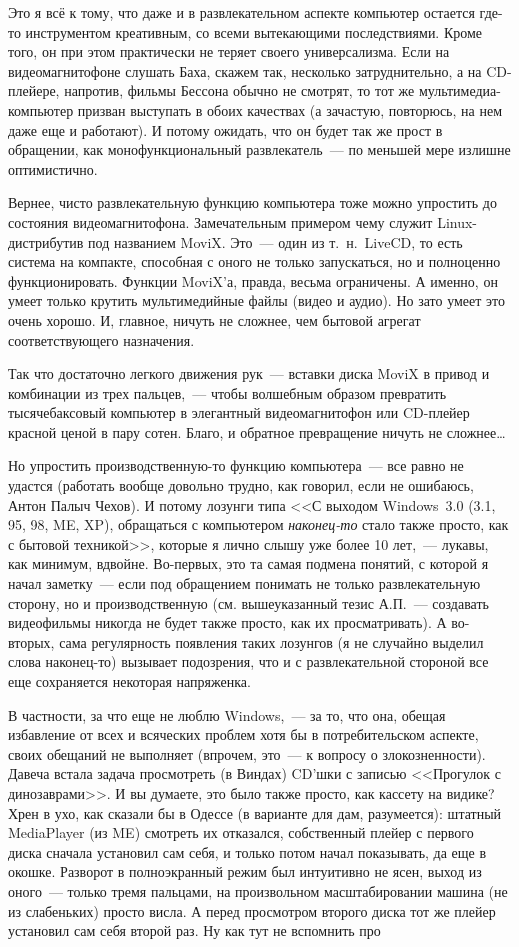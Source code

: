 Это я всё к тому, что даже и в развлекательном аспекте компьютер остается где-то инструментом креативным, со всеми вытекающими последствиями. Кроме того, он при этом практически не теряет своего универсализма. Если на видеомагнитофоне слушать Баха, скажем так, несколько затруднительно, а на CD-плейере, напротив, фильмы Бессона обычно не смотрят, то тот же мультимедиа-компьютер призван выступать в обоих качествах (а зачастую, повторюсь, на нем даже еще и работают). И потому ожидать, что он будет так же прост в обращении, как монофункциональный развлекатель~--- по меньшей мере излишне оптимистично.

Вернее, чисто развлекательную функцию компьютера тоже можно упростить до состояния видеомагнитофона. Замечательным примером чему служит Linux-дистрибутив под названием MoviX. Это~--- один из т.~н.~LiveCD, то есть система на компакте, способная с оного не только запускаться, но и полноценно функционировать. Функции MoviX'а, правда, весьма ограничены. А именно, он умеет только крутить мультимедийные файлы (видео и аудио). Но зато умеет это очень хорошо. И, главное, ничуть не сложнее, чем бытовой агрегат соответствующего назначения.

Так что достаточно легкого движения рук~--- вставки диска MoviX в привод и комбинации из трех пальцев,~--- чтобы волшебным образом превратить тысячебаксовый компьютер в элегантный видеомагнитофон или CD-плейер красной ценой в пару сотен. Благо, и обратное превращение ничуть не сложнее\dots

Но упростить производственную-то функцию компьютера~--- все равно не удастся (работать вообще довольно трудно, как говорил, если не ошибаюсь, Антон Палыч Чехов). И потому лозунги типа <<С выходом Windows~3.0 (3.1, 95, 98, ME, XP), обращаться с компьютером \textit{наконец-то} стало также просто, как с бытовой техникой>>, которые я лично слышу уже более 10 лет,~--- лукавы, как минимум, вдвойне. Во-первых, это та самая подмена понятий, с которой я начал заметку~--- если под обращением понимать не только развлекательную сторону, но и производственную (см. вышеуказанный тезис А.П.~--- создавать видеофильмы никогда не будет также просто, как их просматривать). А во-вторых, сама регулярность появления таких лозунгов (я не случайно выделил слова наконец-то) вызывает подозрения, что и с развлекательной стороной все еще сохраняется некоторая напряженка.

В частности, за что еще не люблю Windows,~--- за то, что она, обещая избавление от всех и всяческих проблем хотя бы в потребительском аспекте, своих обещаний не выполняет (впрочем, это~--- к вопросу о злокозненности). Давеча встала задача просмотреть (в Виндах) CD'шки с записью <<Прогулок с динозаврами>>. И вы думаете, это было также просто, как кассету на видике? Хрен в ухо, как сказали бы в Одессе (в варианте для дам, разумеется): штатный MediaPlayer (из ME) смотреть их отказался, собственный плейер с первого диска сначала установил сам себя, и только потом начал показывать, да еще в окошке. Разворот в полноэкранный режим был интуитивно не ясен, выход из оного~--- только тремя пальцами, на произвольном масштабировании машина (не из слабеньких) просто висла. А перед просмотром второго диска тот же плейер установил сам себя второй раз. Ну как тут не вспомнить про

